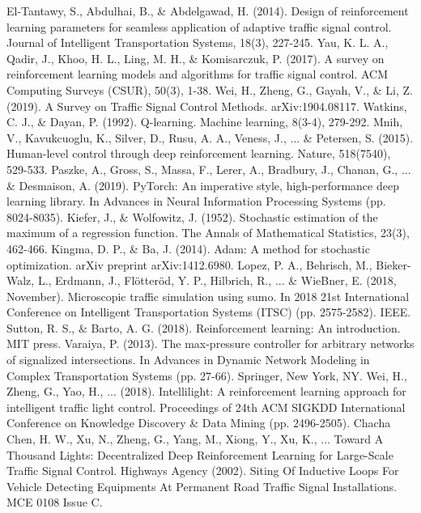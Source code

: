 \documentclass{article}
\begin{document}
\begin{thebibliography}{00}
 El-Tantawy, S., Abdulhai, B., \& Abdelgawad, H. (2014). Design of reinforcement learning parameters for seamless application of adaptive traffic signal control. Journal of Intelligent Transportation Systems, 18(3), 227-245.
 Yau, K. L. A., Qadir, J., Khoo, H. L., Ling, M. H., \& Komisarczuk, P. (2017). A survey on reinforcement learning models and algorithms for traffic signal control. ACM Computing Surveys (CSUR), 50(3), 1-38.
 Wei, H., Zheng, G., Gayah, V., \& Li, Z. (2019). A Survey on Traffic Signal Control Methods. arXiv:1904.08117.
 Watkins, C. J., \& Dayan, P. (1992). Q-learning. Machine learning, 8(3-4), 279-292.
 Mnih, V., Kavukcuoglu, K., Silver, D., Rusu, A. A., Veness, J.,  ... \& Petersen, S. (2015). Human-level control through deep reinforcement learning. Nature, 518(7540), 529-533.
 Paszke, A., Gross, S., Massa, F., Lerer, A., Bradbury, J., Chanan, G., ... \& Desmaison, A. (2019). PyTorch: An imperative style, high-performance deep learning library. In Advances in Neural Information Processing Systems (pp. 8024-8035).
 Kiefer, J., \& Wolfowitz, J. (1952). Stochastic estimation of the maximum of a regression function. The Annals of Mathematical Statistics, 23(3), 462-466.
 Kingma, D. P., \& Ba, J. (2014). Adam: A method for stochastic optimization. arXiv preprint arXiv:1412.6980.
 Lopez, P. A., Behrisch, M., Bieker-Walz, L., Erdmann, J., Flötteröd, Y. P., Hilbrich, R., ... \& WieBner, E. (2018, November). Microscopic traffic simulation using sumo. In 2018 21st International Conference on Intelligent Transportation Systems (ITSC) (pp. 2575-2582). IEEE.
 Sutton, R. S., \& Barto, A. G. (2018). Reinforcement learning: An introduction. MIT press.
 Varaiya, P. (2013). The max-pressure controller for arbitrary networks of signalized intersections. In Advances in Dynamic Network Modeling in Complex Transportation Systems (pp. 27-66). Springer, New York, NY.
 Wei, H., Zheng, G., Yao, H., ... (2018). Intellilight: A reinforcement learning approach for intelligent traffic light control. Proceedings of  24th ACM SIGKDD International Conference on Knowledge Discovery \& Data Mining (pp. 2496-2505).
 Chacha Chen, H. W., Xu, N., Zheng, G., Yang, M., Xiong, Y., Xu, K., ... Toward A Thousand Lights: Decentralized Deep Reinforcement Learning for Large-Scale Traffic Signal Control.
 Highways Agency (2002). Siting Of Inductive Loops For Vehicle Detecting Equipments At Permanent Road Traffic Signal Installations. MCE 0108 Issue C.
\end{thebibliography}
\end{document}

